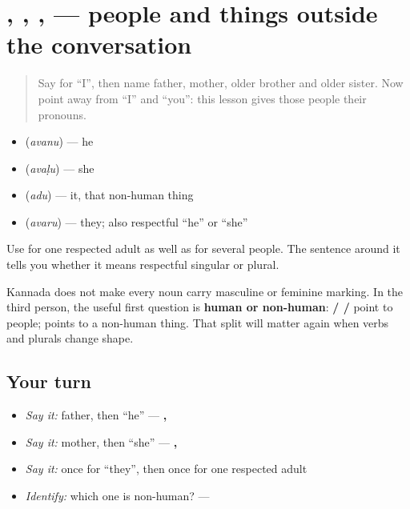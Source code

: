\section[\texorpdfstring{\kn{ಅವನು} \kn{ಅವಳು} \kn{ಅದು} \kn{ಅವರು} (avanu avaḷu adu …)}{ಅವನು ಅವಳು ಅದು ಅವರು (avanu avaḷu adu …)}]{, , ,  — people and things outside the conversation}

\label{lesson:KA-C12-third-person}



\begin{quote}
Say \textbf{} for “I”, then name father, mother, older brother and older sister. Now point away from “I” and “you”: this lesson gives those people their pronouns.
\end{quote}

\begin{grammarlens}[title={Grammar Lens: four third-person forms}]
\begin{itemize}
\raggedright
  \item \textbf{} (\emph{avanu}) — he
  \item \textbf{} (\emph{avaḷu}) — she
  \item \textbf{} (\emph{adu}) — it, that non-human thing
  \item \textbf{} (\emph{avaru}) — they; also respectful “he” or “she”
\end{itemize}

Use \textbf{} for one respected adult as well as for several people. The sentence around it tells you whether it means respectful singular or plural.
\end{grammarlens}

\begin{grammarlens}[title={Grammar Lens: the first split is human or non-human}]
Kannada does not make every noun carry masculine or feminine marking. In the third person, the useful first question is \textbf{human or non-human}: \textbf{ /  / } point to people; \textbf{} points to a non-human thing. That split will matter again when verbs and plurals change shape.
\end{grammarlens}

\subsection*{Your turn}
\begin{itemize}
\raggedright
  \item \emph{Say it:} father, then “he” — \textbf{, }
  \item \emph{Say it:} mother, then “she” — \textbf{, }
  \item \emph{Say it:} \textbf{} once for “they”, then once for one respected adult
  \item \emph{Identify:} which one is non-human? — \textbf{}
\end{itemize}

